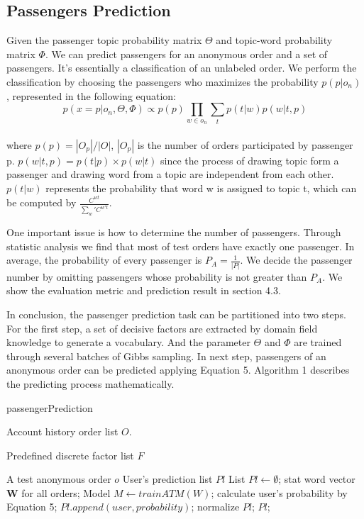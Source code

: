 \documentclass{sig-alternate-05-2015}
\begin{document}
\subsection{Passengers Prediction}
Given the passenger topic probability matrix $\Theta$ and topic-word probability matrix $\Phi$. We can predict passengers for an anonymous order and a set of passengers. It's essentially a classification of an unlabeled order\cite{shanshan:unpopular}. We perform the classification by choosing the passengers who maximizes the probability $p(p|o_n)$, represented in the following equation:\\
\begin{equation}
p(x=p|o_n,\Theta,\Phi) \propto p(p)\prod_{w \in o_n}\sum_t p(t|w)p(w|t,p)
\end{equation}\\
where $p(p) = |O_p| / |O|$, $|O_p|$ is the number of orders participated by passenger p. $p(w|t,p) = p(t|p) \times p(w|t)$ since the process of drawing topic form a passenger and drawing word from a topic are independent from each other. $p(t|w)$ represents the probability that word w is assigned to topic t, which can be computed by $\frac{C^{wt}}{\sum_w'C^{w't}}$.\par
One important issue is how to determine the number of passengers. Through statistic analysis we find that most of test orders have exactly one passenger. In average, the probability of every passenger is $P_A = \frac{1}{|P|}$. We decide the passenger number by omitting passengers whose probability is not greater than $P_A$. We show the evaluation metric and prediction result in section 4.3.\par
In conclusion, the passenger prediction task can be partitioned into two steps. For the first step, a set of decisive factors are extracted by domain field knowledge to generate a vocabulary. And the parameter $\Theta$ and $\Phi$ are trained through several batches of Gibbs sampling. In next step, passengers of an anonymous order can be predicted applying Equation 5. Algorithm 1 describes the predicting process mathematically.\par


\begin{algorithm}[htb]
\caption{passengerPrediction}
\label{alg0}
\begin{algorithmic}[1]
\REQUIRE
Account history order list $O$. \par
Predefined discrete factor list $F$ \par
A test anonymous order $o$
\ENSURE 
User's prediction list $Pl$
\STATE List $Pl \leftarrow \emptyset$;
\STATE stat word vector $\mathbf{W}$ for all orders;
\STATE Model $M \leftarrow trainATM(W)$;
\STATE calculate user's probability by Equation 5;
\STATE $Pl.append(user,probability)$;
\ENDIF
\ENDFOR
\STATE normalize $Pl$;
\RETURN $Pl$;
\end{algorithmic} 
\end{algorithm}
\end{document}

